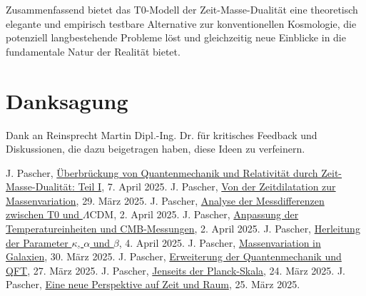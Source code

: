 \documentclass[12pt,a4paper]{article}
\newenvironment{acknowledgments}{\section*{Danksagung}}{\vspace{1em}}
\newcommand{\LCDM}{\Lambda\text{CDM}}
\begin{document}
	Zusammenfassend bietet das T0-Modell der Zeit-Masse-Dualität eine theoretisch elegante und empirisch testbare Alternative zur konventionellen Kosmologie, die potenziell langbestehende Probleme löst und gleichzeitig neue Einblicke in die fundamentale Natur der Realität bietet.
	
	\begin{acknowledgments}
		Dank an Reinsprecht Martin Dipl.-Ing. Dr. für kritisches Feedback und Diskussionen, die dazu beigetragen haben, diese Ideen zu verfeinern.
	\end{acknowledgments}
	
	\clearpage  %
	
	\begin{thebibliography}{99}
		 J. Pascher, \href{https://github.com/jpascher/T0-Time-Mass-Duality/tree/main/2/pdf/Deutsch/QMRelTimeMassPart1Z.pdf}{Überbrückung von Quantenmechanik und Relativität durch Zeit-Masse-Dualität: Teil I}, 7. April 2025.
		 J. Pascher, \href{https://github.com/jpascher/T0-Time-Mass-Duality/tree/main/2/pdf/Deutsch/MathZeitMasseLagrange.pdf}{Von der Zeitdilatation zur Massenvariation}, 29. März 2025.
		 J. Pascher, \href{https://github.com/jpascher/T0-Time-Mass-Duality/tree/main/2/pdf/Deutsch/MessdifferenzenT0Standard.pdf}{Analyse der Messdifferenzen zwischen T0 und \(\LCDM\)}, 2. April 2025.
		 J. Pascher, \href{https://github.com/jpascher/T0-Time-Mass-Duality/tree/main/2/pdf/Deutsch/TempEinheitenCMB.pdf}{Anpassung der Temperatureinheiten und CMB-Messungen}, 2. April 2025.
		 J. Pascher, \href{https://github.com/jpascher/T0-Time-Mass-Duality/tree/main/2/pdf/Deutsch/ZeitMasseT0Params.pdf}{Herleitung der Parameter \(\kappa\), \(\alpha\) und \(\beta\)}, 4. April 2025.
		 J. Pascher, \href{https://github.com/jpascher/T0-Time-Mass-Duality/tree/main/2/pdf/Deutsch/MassVarGalaxien.pdf}{Massenvariation in Galaxien}, 30. März 2025.
		 J. Pascher, \href{https://github.com/jpascher/T0-Time-Mass-Duality/tree/main/2/pdf/Deutsch/NotwendigkeitQMErweiterung.pdf}{Erweiterung der Quantenmechanik und QFT}, 27. März 2025.
		 J. Pascher, \href{https://github.com/jpascher/T0-Time-Mass-Duality/tree/main/2/pdf/Deutsch/JenseitsPlanck.pdf}{Jenseits der Planck-Skala}, 24. März 2025.
		 J. Pascher, \href{https://github.com/jpascher/T0-Time-Mass-Duality/tree/main/2/pdf/Deutsch/ZeitRaumPascher.pdf}{Eine neue Perspektive auf Zeit und Raum}, 25. März 2025.

\end{thebibliography}
\end{document}
